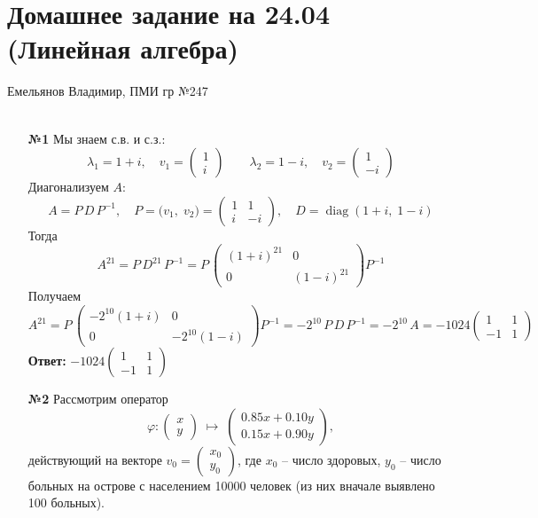 \documentclass[a4paper]{article}
\renewcommand{\phi}{\varphi}
\begin{document}
\section*{Домашнее задание на 24.04 (Линейная алгебра)}
{\large Емельянов Владимир, ПМИ гр №247}\\\\
\begin{enumerate}
  \item[\textbf{№1}]Мы знаем с.в. и с.з.:
  $$\lambda_1=1+i,\quad v_1=\begin{pmatrix}1\\i\end{pmatrix}
  \qquad
  \lambda_2=1-i,\quad v_2=\begin{pmatrix}1\\-i\end{pmatrix}$$
  Диагонализуем \(A\):
  \[
  A = P\,D\,P^{-1},\quad
  P=\bigl(v_1,\;v_2\bigr)
  =\begin{pmatrix}1&1\\i&-i\end{pmatrix},\quad
  D=\operatorname{diag}(1+i,\;1-i)
  \]
  Тогда
  $$
  A^{21}
  = P\,D^{21}\,P^{-1}
  = P\,\begin{pmatrix}(1+i)^{21}&0\\0&(1-i)^{21}\end{pmatrix}P^{-1}
  $$
  Получаем
  $$
  A^{21}
  = P\,\begin{pmatrix}-2^{10}(1+i)&0\\0&-2^{10}(1-i)\end{pmatrix}P^{-1}
  =-2^{10}\,P\,D\,P^{-1}
  =-2^{10}\,A
  =-1024\begin{pmatrix}1&1\\-1&1\end{pmatrix}
  $$
  \textbf{Ответ: } $-1024\begin{pmatrix}1&1\\-1&1\end{pmatrix}$\\

  \item[\textbf{№2}]Рассмотрим оператор
  $$
  \phi:\begin{pmatrix}x\\y\end{pmatrix}\;\longmapsto\;
  \begin{pmatrix}
  0.85x+0.10y\\[6pt]
  0.15x+0.90y
  \end{pmatrix},
  $$
  действующий на векторе
  $\displaystyle v_0=\begin{pmatrix}x_0\\y_0\end{pmatrix}$,
  где $x_0$ – число здоровых, $y_0$ – число больных на острове с населением 10000 человек (из них вначале выявлено 100 больных).


\end{enumerate}
\end{document}
